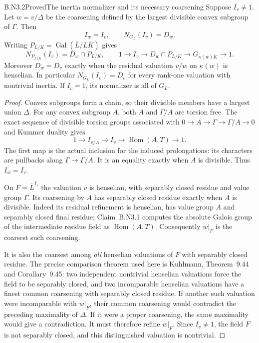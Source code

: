 \begin{claim}{B.N3.2}{Proved}{The inertia normalizer and its necessary coarsening}
Suppose $I_v\ne1$.  Let $w=v/\Delta$ be the coarsening defined by
the largest divisible convex subgroup of $\Gamma$.  Then
\[
 I_w=I_v,\qquad N_{G_L}(I_v)=D_w.
\]
Writing $P_{L/K}=\operatorname{Gal}(\overline L/L\overline K)$ gives
\[
 N_{P_{L/K}}(I_v)=D_w\cap P_{L/K},\qquad
 1\to I_v\to D_w\cap P_{L/K}\to
 G_{\kappa(w)\overline K}\to1.
\]
Moreover $D_w=D_v$ exactly when the residual valuation $v/w$ on
$\kappa(w)$ is henselian.  In particular $N_{G_L}(I_v)=D_v$ for
every rank-one valuation with nontrivial inertia.  If $I_v=1$, its
normalizer is all of $G_L$.
\end{claim}
\begin{proof}
Convex subgroups form a chain, so their divisible members have a
largest union $\Delta$.  For any convex subgroup $A$, both $A$ and
$\Gamma/A$ are torsion free.  The exact sequence of divisible torsion
groups associated with $0\to A\to\Gamma\to\Gamma/A\to0$ and
Kummer duality gives
\[
 1\to I_{v/A}\to I_v\to\operatorname{Hom}(A,T)\to1.
\]
The first map is the actual inclusion for the induced prolongations:
its characters are pullbacks along $\Gamma\to\Gamma/A$.  It is an
equality exactly when $A$ is divisible.  Thus $I_w=I_v$.

On $F=\overline L^{I_v}$ the valuation $v$ is henselian, with
separably closed residue and value group $\Gamma$.  Its coarsening
by $A$ has separably closed residue exactly when $A$ is divisible.
Indeed its residual refinement is henselian, has value group $A$
and separably closed final residue; Claim~B.N3.1 computes the absolute
Galois group of the intermediate residue field as
$\operatorname{Hom}(A,T)$.  Consequently $w|_F$ is the coarsest
such coarsening.

It is also the coarsest among \emph{all} henselian valuations of $F$
with separably closed residue.  The precise comparison theorem used
here is Kuhlmann, Theorem~9.44 and Corollary~9.45: two independent
nontrivial henselian valuations force the field to be separably
closed, and two incomparable henselian valuations have a finest common
coarsening with separably closed residue.  If another such valuation
were incomparable with $w|_F$, their common coarsening would contradict
the preceding maximality of $\Delta$.  If it were a proper coarsening,
the same maximality would give a contradiction.  It must therefore
refine $w|_F$.  Since $I_v\ne1$, the field $F$ is not separably
closed, and this distinguished valuation is nontrivial.


\end{proof}
